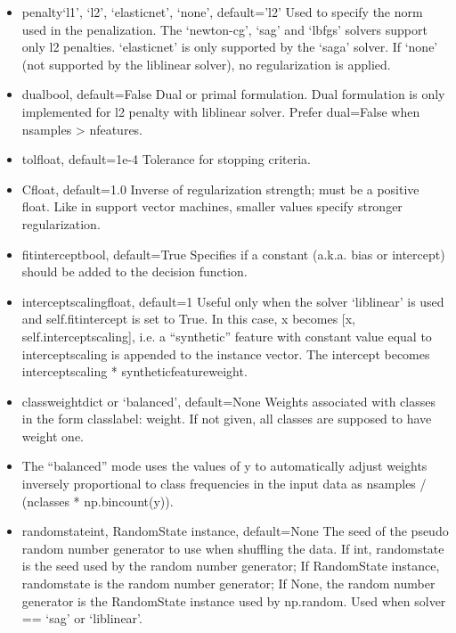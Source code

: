 \documentclass[12pt]{article}
\begin{document}
\begin{itemize}
\item
penalty{‘l1’, ‘l2’, ‘elasticnet’, ‘none’}, default=’l2’
Used to specify the norm used in the penalization. The ‘newton-cg’, ‘sag’ and ‘lbfgs’ solvers support only l2 penalties. ‘elasticnet’ is only supported by the ‘saga’ solver. If ‘none’ (not supported by the liblinear solver), no regularization is applied.

\item
dualbool, default=False
Dual or primal formulation. Dual formulation is only implemented for l2 penalty with liblinear solver. Prefer dual=False when n\textunderscore samples > n\textunderscore features.

\item
tolfloat, default=1e-4
Tolerance for stopping criteria.

\item
Cfloat, default=1.0
Inverse of regularization strength; must be a positive float. Like in support vector machines, smaller values specify stronger regularization.

\item
fit\textunderscore interceptbool, default=True
Specifies if a constant (a.k.a. bias or intercept) should be added to the decision function.

\item
intercept\textunderscore scalingfloat, default=1
Useful only when the solver ‘liblinear’ is used and self.fit\textunderscore intercept is set to True. 
In this case, x becomes [x, self.intercept\textunderscore scaling], i.e. a “synthetic” feature with constant value equal to intercept\textunderscore scaling is appended to the instance vector. The intercept becomes intercept\textunderscore scaling * synthetic\textunderscore feature\textunderscore weight.


\item
class\textunderscore weightdict or ‘balanced’, default=None
Weights associated with classes in the form {class\textunderscore label: weight}. If not given, all classes are supposed to have weight one.

\item
The “balanced” mode uses the values of y to automatically adjust weights inversely proportional to class frequencies in the input data as n\textunderscore samples / (n\textunderscore classes * np.bincount(y)).

\item
random\textunderscore stateint, RandomState instance, default=None
The seed of the pseudo random number generator to use when shuffling the data. If int, random\textunderscore state is the seed used by the random number generator; If RandomState instance, random\textunderscore state is the random number generator; If None, the random number generator is the RandomState instance used by np.random. Used when solver == ‘sag’ or ‘liblinear’.


\end{itemize}
\end{document}
